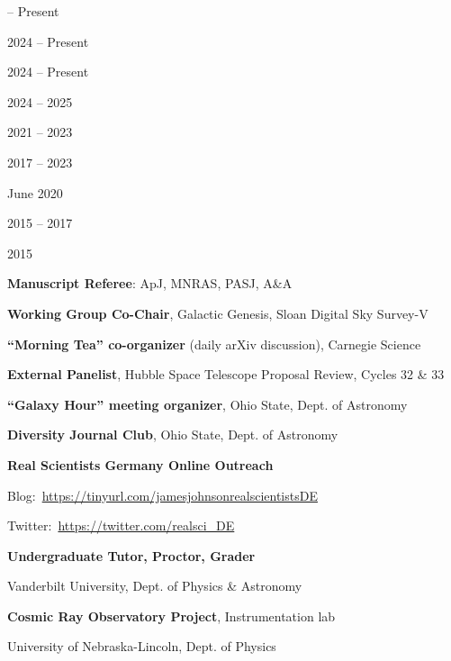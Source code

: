 \documentclass[cv.tex]{subfiles}
\begin{document}
\parbox{0.18\textwidth}{%
	 -- Present \par
	2024 -- Present \par
	2024 -- Present \par
	2024 -- 2025 \par
	2021 -- 2023 \par
	2017 -- 2023 \par
	June 2020 \par
	\null \par
	\null \par
	2015 -- 2017 \par
	\null \par
	2015 \par
	\null \par
}
\hspace{1mm}
\parbox{0.8\textwidth}{%
	\vspace{1mm}
	\textbf{Manuscript Referee}: ApJ, MNRAS, PASJ, A\&A \par
	\textbf{Working Group Co-Chair}, Galactic Genesis, Sloan Digital Sky Survey-V
	\par
	\textbf{``Morning Tea'' co-organizer} (daily arXiv discussion), Carnegie
	Science \par
	\textbf{External Panelist}, Hubble Space Telescope Proposal Review, Cycles 32 \& 33
	\par
	\textbf{``Galaxy Hour'' meeting organizer}, Ohio State, Dept. of Astronomy
	\par
	\textbf{Diversity Journal Club}, Ohio State, Dept. of Astronomy \par
	\textbf{Real Scientists Germany Online Outreach} \par
	Blog:~\url{https://tinyurl.com/jamesjohnsonrealscientistsDE} \par
	Twitter:~\url{https://twitter.com/realsci_DE} \par
	\textbf{Undergraduate Tutor, Proctor, Grader} \par
	Vanderbilt University, Dept. of Physics \& Astronomy \par
	\textbf{Cosmic Ray Observatory Project}, Instrumentation lab \par
	University of Nebraska-Lincoln, Dept. of Physics \par
}
\end{document}

